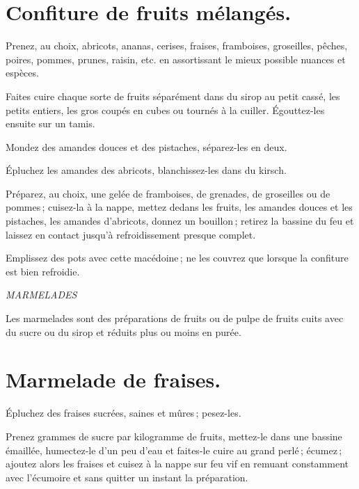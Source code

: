 \section*{\centering Confiture de fruits mélangés.}
{}

Prenez, au choix, abricots, ananas, cerises, fraises, framboises, groseilles,
pêches, poires, pommes, prunes, raisin, etc. en assortissant le mieux possible
nuances et espèces.

Faites cuire chaque sorte de fruits séparément dans du sirop au petit cassé,
les petits entiers, les gros coupés en cubes ou tournés à la cuiller.
Égouttez-les ensuite sur un tamis.

Mondez des amandes douces et des pistaches, séparez-les en deux.

Épluchez les amandes des abricots, blanchissez-les dans du kirsch.

Préparez, au choix, une gelée de framboises, de grenades, de groseilles ou de
pommes ; cuisez-la à la nappe, mettez dedans les fruits, les amandes douces et
les pistaches, les amandes d'abricots, donnez un bouillon ; retirez la bassine
du feu et laissez en contact jusqu'à refroidissement presque complet.

Emplissez des pots avec cette macédoine ; ne les couvrez que lorsque la
confiture est bien refroidie.

\bigskip

\begin{center}
\textit{MARMELADES}
\end{center}

\bigskip


Les marmelades sont des préparations de fruits ou de pulpe de fruits cuits avec
du sucre ou du sirop et réduits plus ou moins en purée.

\section*{\centering Marmelade de fraises.}
{}

Épluchez des fraises sucrées, saines et mûres ; pesez-les.

Prenez {\mmm} grammes de sucre par kilogramme de fruits, mettez-le dans
une bassine émaillée, humectez-le d'un peu d’eau et faites-le cuire au grand
perlé ; écumez ; ajoutez alors les fraises et cuisez à la nappe sur feu vif en
remuant constamment avec l'écumoire et sans quitter un instant la préparation.

